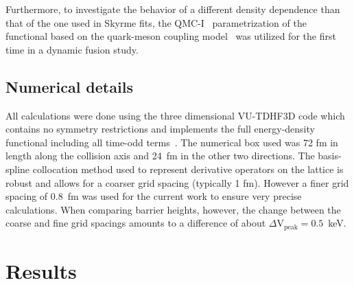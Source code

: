 Furthermore, to investigate the behavior of a different density dependence than that of the one used in Skyrme fits, the QMC-I~\protect\citep{stone2016} parametrization of the functional based on the quark-meson coupling model~\protect\citep{guichon1988,guichon1996} was utilized for the first time in a dynamic fusion study.

\subsection{Numerical details}

All calculations were done using the three dimensional VU-TDHF3D code which contains no symmetry restrictions and implements the full energy-density functional including all time-odd terms~\protect\citep{umar2006c}. 
The numerical box used was 72 fm in length along the collision axis and 24~fm in the other two directions.
The basis-spline collocation method used to represent derivative operators on the lattice is robust and allows for a coarser grid spacing (typically 1 fm).
However a finer grid spacing of 0.8~fm was used for the current work to ensure very precise calculations. 
When comparing barrier heights, however, the change between the coarse and fine grid spacings amounts to a difference of about $\Delta \mathrm{V}_{\mathrm{peak}}=0.5$~keV.

\section{Results}
\label{sec:res}

